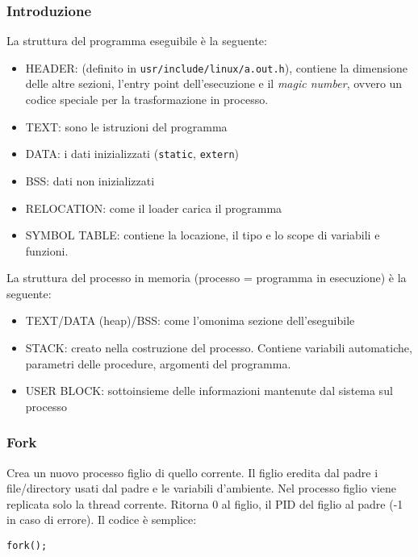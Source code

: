 \documentclass[a4paper]{article}
\begin{document}
\subsubsection{Introduzione}
La struttura del programma eseguibile è la seguente:
\begin{itemize}
\item HEADER: (definito in \verb|usr/include/linux/a.out.h|), contiene la dimensione delle altre sezioni, l'entry point dell'esecuzione e il \textit{magic number}, ovvero un codice speciale per la trasformazione in processo.
\item TEXT: sono le istruzioni del programma
\item DATA: i dati inizializzati (\verb|static|, \verb|extern|)
\item BSS: dati non inizializzati
\item RELOCATION: come il loader carica il programma
\item SYMBOL TABLE: contiene la locazione, il tipo e lo scope di variabili e funzioni.
\end{itemize}
La struttura del processo in memoria (processo = programma in esecuzione) è la seguente:
\begin{itemize}
\item TEXT/DATA (heap)/BSS: come l'omonima sezione dell'eseguibile
\item STACK: creato nella costruzione del processo. Contiene variabili automatiche, parametri delle procedure, argomenti del programma.
\item USER BLOCK: sottoinsieme delle informazioni mantenute dal sistema sul processo
\end{itemize}

\subsubsection{Fork}
Crea un nuovo processo figlio di quello corrente. Il figlio eredita dal padre i file/directory usati dal padre e le variabili d'ambiente.
Nel processo figlio viene replicata solo la thread corrente.
Ritorna 0 al figlio, il PID del figlio al padre (-1 in caso di errore).
Il codice è semplice:
\begin{verbatim}
fork();
\end{verbatim}
\end{document}
